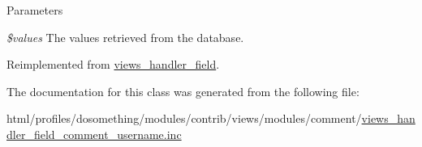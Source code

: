\begin{DoxyParams}{Parameters}
\item[{\em \$values}]The values retrieved from the database. \end{DoxyParams}


Reimplemented from \hyperlink{classviews__handler__field_a82ff951c5e9ceb97b2eab86f880cbc1e}{views\_\-handler\_\-field}.

The documentation for this class was generated from the following file:\begin{DoxyCompactItemize}
\item 
html/profiles/dosomething/modules/contrib/views/modules/comment/\hyperlink{views__handler__field__comment__username_8inc}{views\_\-handler\_\-field\_\-comment\_\-username.inc}\end{DoxyCompactItemize}
